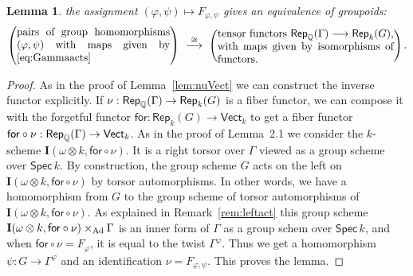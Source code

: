 \documentclass[twoside,leqno]{article}
\numberwithin{equation}{section}
\theoremstyle{plain}
\newtheorem{lemma}[equation]{Lemma}
\theoremstyle{definition}
\begin{document}
\begin{lemma} \label{lem:nuRep}
the assignment $(\varphi,\psi) \mapsto
F_{\varphi,\psi}$ gives an equivalence of groupoids:
\[
\left(\text{\begin{minipage}[c]{2in} pairs
  of group homomorphisms $(\varphi,\psi)$
  with maps given by \eqref{eq:Gammaacts}\end{minipage}}\right) \
\stackrel{\cong}{\longrightarrow} \  \left(\text{\begin{minipage}[c]{2.3in} tensor
functors $\mathsf{Rep}_{\bbQ}(\Gamma) \longrightarrow
\mathsf{Rep}_{k}(G)$, with maps given by isomorphisms of functors.
\end{minipage}}\right).
\]
\end{lemma}
\begin{proof}
As in the proof of Lemma~\ref{lem:nuVect} we can construct the
 inverse functor explicitly. If \linebreak 
 $\nu : \mathsf{Rep}_{\mathbb Q}(\Gamma) \to
 \mathsf{Rep}_{k}(G)$ is a fiber functor, we can compose it with the
 forgetful functor \linebreak $\mathsf{for} : \mathsf{Rep}_{k}(G) \to
 \mathsf{Vect}_{k}$ to get a fiber functor $\mathsf{for}\circ\nu :
 \mathsf{Rep}_{\mathbb Q}(\Gamma) \to \mathsf{Vect}_{k}$. As in the proof
 of Lemma~2.1 we consider the $k$-scheme $\mathbf{I}(\omega\otimes
 k,\mathsf{for}\circ \nu)$. It is a right torsor over $\Gamma$ viewed
 as a group scheme over $\mathsf{Spec}\, k$.  By construction, the
 group scheme $G$ acts on the left on $\mathbf{I}(\omega\otimes
 k,\mathsf{for}\circ \nu)$ by torsor automorphisms. In other words,
 we have a homomorphism from $G$ to the group scheme of torsor
 automorphisms of $\mathbf{I}(\omega\otimes k,\mathsf{for}\circ
 \nu)$. As explained in Remark~\ref{rem:leftact} this group scheme
 $\mathbf{I}(\omega\otimes k,\mathsf{for}\circ \nu)\times_{\operatorname{Ad}}
 \Gamma$ is an inner form of $\Gamma$ as a group schem over
 $\mathsf{Spec}\, k$, and when $\mathsf{for}\circ \nu = F_{\varphi}$,
 it is equal to the twist $\Gamma^{\varphi}$. Thus we get a
 homomorphism $\psi : G \to \Gamma^{\varphi}$ and an identification
 $\nu = F_{\varphi,\psi}$. This proves the lemma.
\end{proof}
\end{document}

